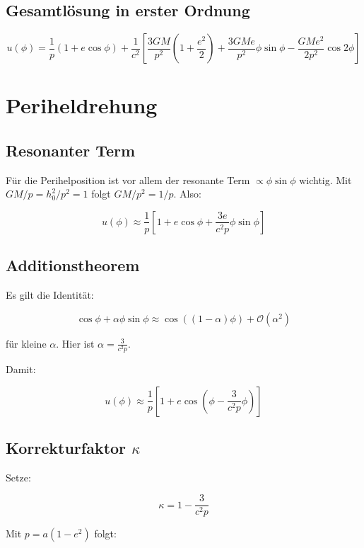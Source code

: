 \subsection{Gesamtlösung in erster Ordnung}
\label{sub:periheldrehung_gesamtloesung}

\[
u(\phi) = \frac{1}{p} (1 + e \cos \phi) 
+ \frac{1}{c^2} \left[ \frac{3GM}{p^2} \left(1 + \frac{e^2}{2}\right) 
+ \frac{3GM e}{p^2} \phi \sin \phi 
- \frac{GM e^2}{2p^2} \cos 2\phi \right]
\]

\section{Periheldrehung}
\label{app:periheldrehung_perihel}

\subsection{Resonanter Term}
\label{sub:periheldrehung_resonanz}

Für die Perihelposition ist vor allem der resonante Term \( \propto \phi \sin \phi \) wichtig. Mit \( GM/p = h_0^2/p^2 = 1 \) folgt \( GM/p^2 = 1/p \). Also:

\[
u(\phi) \approx \frac{1}{p} \left[ 1 + e \cos \phi + \frac{3e}{c^2 p} \phi \sin \phi \right]
\]

\subsection{Additionstheorem}
\label{sub:periheldrehung_addition}

Es gilt die Identität:

\[
\cos \phi + \alpha \phi \sin \phi \approx \cos( (1 - \alpha) \phi ) + \mathcal{O}(\alpha^2)
\]

für kleine \( \alpha \). Hier ist \( \alpha = \frac{3}{c^2 p} \).

Damit:

\[
u(\phi) \approx \frac{1}{p} \left[ 1 + e \cos\left( \phi - \frac{3}{c^2 p} \phi \right) \right]
\]

\subsection{Korrekturfaktor \( \kappa \)}
\label{sub:periheldrehung_kappa}

Setze:

\[
\kappa = 1 - \frac{3}{c^2 p}
\]

Mit \( p = a(1-e^2) \) folgt:

